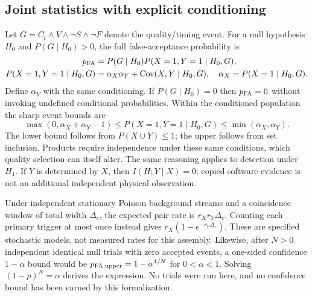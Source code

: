\subsection{Joint statistics with explicit conditioning}
Let $G=C_t\land V\land\neg S\land\neg F$ denote the quality/timing event.
For a null hypothesis $H_0$ and $P(G\mid H_0)>0$, the full false-acceptance
probability is
\begin{align}
 p_{\rm FA}&=P(G\mid H_0)P(X=1,Y=1\mid H_0,G),\\
 P(X=1,Y=1\mid H_0,G)
  &=\alpha_X\alpha_Y+\operatorname{Cov}(X,Y\mid H_0,G),
 \quad\alpha_X=P(X=1\mid H_0,G).
\end{align}
Define $\alpha_Y$ with the same conditioning. If $P(G\mid H_0)=0$ then
$p_{\rm FA}=0$ without invoking undefined conditional probabilities. Within
the conditioned population the sharp event bounds are
\begin{equation}
 \max(0,\alpha_X+\alpha_Y-1)
 \le P(X=1,Y=1\mid H_0,G)\le\min(\alpha_X,\alpha_Y).
\end{equation}
The lower bound follows from $P(X\cup Y)\le1$; the upper follows from set
inclusion. Products require independence under these same conditions, which
quality selection can itself alter. The same reasoning applies to detection
under $H_1$. If $Y$ is determined by $X$, then $I(H;Y\mid X)=0$; copied
software evidence is not an additional independent physical observation.

Under independent stationary Poisson background streams and a coincidence
window of total width $\Delta_c$, the expected pair rate is
$r_Xr_Y\Delta_c$. Counting each primary trigger at most once instead gives
$r_X(1-e^{-r_Y\Delta_c})$. These are specified stochastic models, not
measured rates for this assembly. Likewise, after $N>0$ independent identical
null trials with zero accepted events, a one-sided confidence $1-\alpha$
bound would be $p_{\rm FA,upper}=1-\alpha^{1/N}$ for $0<\alpha<1$.
Solving $(1-p)^N=\alpha$ derives the expression. No trials were run here,
and no confidence bound has been earned by this formalization.

